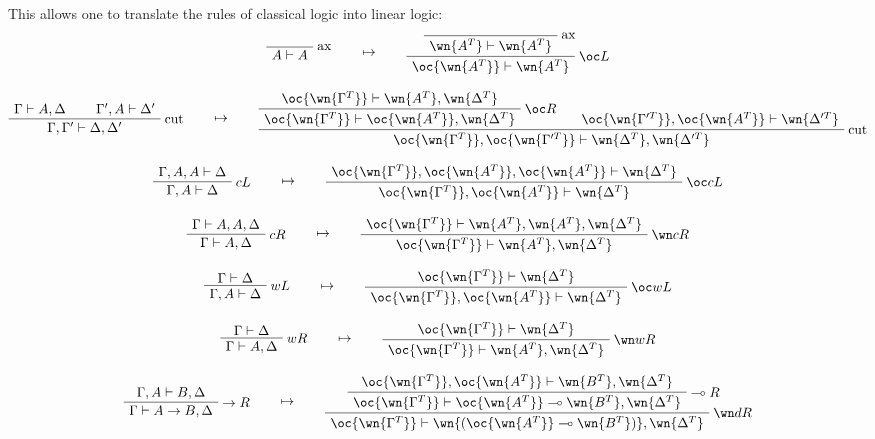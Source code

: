 This allows one to translate the rules of classical logic into linear logic:
\begin{gather*}
\LabelRule{\rulename{ax}}
\NulRule{A\vdash A}
\DisplayProof
\qquad\mapsto\qquad
\LabelRule{\rulename{ax}}
\NulRule{\wn{A^T}\vdash\wn{A^T}}
\LabelRule{\oc L}
\UnaRule{\oc{\wn{A^T}}\vdash\wn{A^T}}
\DisplayProof
\\[2ex]
\AxRule{\Gamma\vdash A,\Delta}
\AxRule{\Gamma',A\vdash\Delta'}
\LabelRule{\rulename{cut}}
\BinRule{\Gamma,\Gamma'\vdash\Delta,\Delta'}
\DisplayProof
\qquad\mapsto\qquad
\AxRule{\oc{\wn{\Gamma^T}}\vdash\wn{A^T},\wn{\Delta^T}}
\LabelRule{\oc R}
\UnaRule{\oc{\wn{\Gamma^T}}\vdash\oc{\wn{A^T}},\wn{\Delta^T}}
\AxRule{\oc{\wn{\Gamma'^T}},\oc{\wn{A^T}}\vdash\wn{\Delta'^T}}
\LabelRule{\rulename{cut}}
\BinRule{\oc{\wn{\Gamma^T}},\oc{\wn{\Gamma'^T}}\vdash\wn{\Delta^T},\wn{\Delta'^T}}
\DisplayProof
\\[2ex]
\AxRule{\Gamma,A,A\vdash\Delta}
\LabelRule{c L}
\UnaRule{\Gamma,A\vdash\Delta}
\DisplayProof
\qquad\mapsto\qquad
\AxRule{\oc{\wn{\Gamma^T}},\oc{\wn{A^T}},\oc{\wn{A^T}}\vdash\wn{\Delta^T}}
\LabelRule{\oc c L}
\UnaRule{\oc{\wn{\Gamma^T}},\oc{\wn{A^T}}\vdash\wn{\Delta^T}}
\DisplayProof
\\[2ex]
\AxRule{\Gamma\vdash A,A,\Delta}
\LabelRule{c R}
\UnaRule{\Gamma\vdash A,\Delta}
\DisplayProof
\qquad\mapsto\qquad
\AxRule{\oc{\wn{\Gamma^T}}\vdash\wn{A^T},\wn{A^T},\wn{\Delta^T}}
\LabelRule{\wn c R}
\UnaRule{\oc{\wn{\Gamma^T}}\vdash\wn{A^T},\wn{\Delta^T}}
\DisplayProof
\\[2ex]
\AxRule{\Gamma\vdash\Delta}
\LabelRule{w L}
\UnaRule{\Gamma,A\vdash\Delta}
\DisplayProof
\qquad\mapsto\qquad
\AxRule{\oc{\wn{\Gamma^T}}\vdash\wn{\Delta^T}}
\LabelRule{\oc w L}
\UnaRule{\oc{\wn{\Gamma^T}},\oc{\wn{A^T}}\vdash\wn{\Delta^T}}
\DisplayProof
\\[2ex]
\AxRule{\Gamma\vdash\Delta}
\LabelRule{w R}
\UnaRule{\Gamma\vdash A,\Delta}
\DisplayProof
\qquad\mapsto\qquad
\AxRule{\oc{\wn{\Gamma^T}}\vdash\wn{\Delta^T}}
\LabelRule{\wn w R}
\UnaRule{\oc{\wn{\Gamma^T}}\vdash\wn{A^T},\wn{\Delta^T}}
\DisplayProof
\\[2ex]
\AxRule{\Gamma,A\vdash B,\Delta}
\LabelRule{\imp R}
\UnaRule{\Gamma\vdash A\imp B,\Delta}
\DisplayProof
\qquad\mapsto\qquad
\AxRule{\oc{\wn{\Gamma^T}},\oc{\wn{A^T}}\vdash\wn{B^T},\wn{\Delta^T}}
\LabelRule{\limp R}
\UnaRule{\oc{\wn{\Gamma^T}}\vdash \oc{\wn{A^T}}\limp\wn{B^T},\wn{\Delta^T}}
\LabelRule{\wn d R}
\UnaRule{\oc{\wn{\Gamma^T}}\vdash \wn{(\oc{\wn{A^T}}\limp\wn{B^T})},\wn{\Delta^T}}
\DisplayProof
\\[2ex]

\end{gather*}
